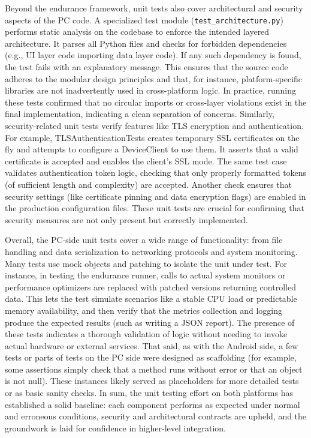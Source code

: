 Beyond the endurance framework, unit tests also cover architectural and security aspects of the PC code. A specialized test module (\texttt{test\_architecture.py}) performs static analysis on the codebase to enforce the intended layered architecture. It parses all Python files and checks for forbidden dependencies (e.g., UI layer code importing data layer code). If any such dependency is found, the test fails with an explanatory message. This ensures that the source code adheres to the modular design principles and that, for instance, platform-specific libraries are not inadvertently used in cross-platform logic. In practice, running these tests confirmed that no circular imports or cross-layer violations exist in the final implementation, indicating a clean separation of concerns. Similarly, security-related unit tests verify features like TLS encryption and authentication. For example, TLSAuthenticationTests creates temporary SSL certificates on the fly and attempts to configure a DeviceClient to use them. It asserts that a valid certificate is accepted and enables the client's SSL mode. The same test case validates authentication token logic, checking that only properly formatted tokens (of sufficient length and complexity) are accepted. Another check ensures that security settings (like certificate pinning and data encryption flags) are enabled in the production configuration files. These unit tests are crucial for confirming that security measures are not only present but correctly implemented.

Overall, the PC-side unit tests cover a wide range of functionality: from file handling and data serialization to networking protocols and system monitoring. Many tests use mock objects and patching to isolate the unit under test. For instance, in testing the endurance runner, calls to actual system monitors or performance optimizers are replaced with patched versions returning controlled data. This lets the test simulate scenarios like a stable CPU load or predictable memory availability, and then verify that the metrics collection and logging produce the expected results (such as writing a JSON report). The presence of these tests indicates a thorough validation of logic without needing to invoke actual hardware or external services. That said, as with the Android side, a few tests or parts of tests on the PC side were designed as scaffolding (for example, some assertions simply check that a method runs without error or that an object is not null). These instances likely served as placeholders for more detailed tests or as basic sanity checks. In sum, the unit testing effort on both platforms has established a solid baseline: each component performs as expected under normal and erroneous conditions, security and architectural contracts are upheld, and the groundwork is laid for confidence in higher-level integration.


